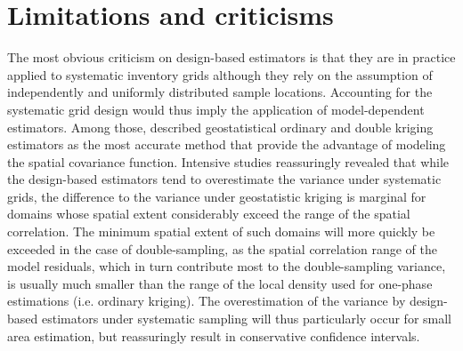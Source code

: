 

\section{Limitations and criticisms}
\label{sec:synth:limits}

The most obvious criticism on design-based estimators is that they are in practice applied to systematic inventory grids although they rely on the assumption of independently and uniformly distributed sample locations. Accounting for the systematic grid design would thus imply the application of model-dependent estimators. Among those, \citet{mandallaz1993} described geostatistical ordinary and double kriging estimators as the most accurate method that provide the advantage of modeling the spatial covariance function. Intensive studies reassuringly revealed that while the design-based estimators tend to overestimate the variance under systematic grids, the difference to the variance under geostatistic kriging is marginal for domains whose spatial extent considerably exceed the range of the spatial correlation. The minimum spatial extent of such domains will more quickly be exceeded in the case of double-sampling, as the spatial correlation range of the model residuals, which in turn contribute most to the double-sampling variance, is usually much smaller than the range of the local density used for one-phase estimations (i.e. ordinary kriging). The overestimation of the variance by design-based estimators under systematic sampling will thus particularly occur for small area estimation, but reassuringly result in conservative confidence intervals.\par

